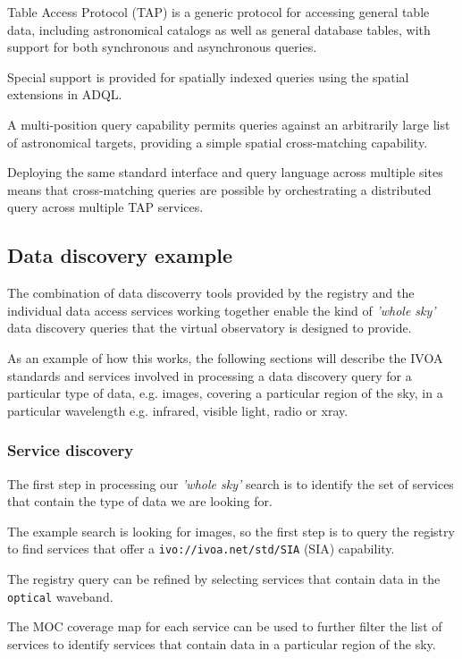 \documentclass{article}
\begin{document}
Table Access Protocol (TAP) is a generic protocol for accessing general table
data, including astronomical catalogs as well as general database tables, with
support for both synchronous and asynchronous queries.

Special support is provided for spatially indexed queries using the spatial
extensions in ADQL.

A multi-position query capability permits queries against an arbitrarily large
list of astronomical targets, providing a simple spatial cross-matching
capability.

Deploying the same standard interface and query language across multiple sites
means that cross-matching queries are possible by orchestrating a distributed
query across multiple TAP services.

\subsection{Data discovery example}

The combination of data discoverry tools provided by the registry and the
individual data access services working together enable the kind of \textit{'whole
sky'} data discovery queries that the virtual observatory is designed to
provide.

As an example of how this works, the following sections will describe the IVOA
standards and services involved in processing a data discovery query for a
particular type of data, e.g. images, covering a particular region of the sky,
in a particular wavelength e.g. infrared, visible light, radio or xray.

\subsubsection{Service discovery}

The first step in processing our \textit{'whole sky'} search is to identify the
set of services that contain the type of data we are looking for.

The example search is looking for images, so the first step is to query the
registry to find services that offer a \texttt{ivo://ivoa.net/std/SIA}
(SIA) capability.

The registry query can be refined by selecting services that contain data in the
\texttt{optical} waveband.

The MOC coverage map for each service can be used to further filter the list of
services to identify services that contain data in a particular region of the sky.
\end{document}
